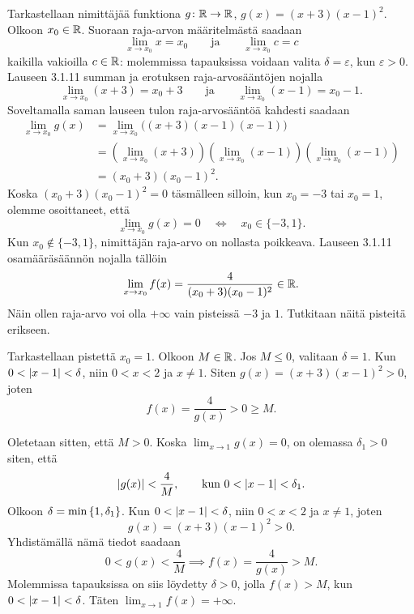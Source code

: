 \documentclass[11pt,a4paper]{amsart}
\begin{document}
\begin{solution}
  Tarkastellaan nimittäjää funktiona \(g\colon \mathbb{R} \to \mathbb{R}\),
  \(g(x) = (x + 3)(x - 1)^2\). Olkoon \(x_0 \in \mathbb{R}\).
  Suoraan raja-arvon määritelmästä saadaan
  \[
    \lim_{x \to x_0} x = x_0
    \qquad\text{ja}\qquad
    \lim_{x \to x_0} c = c
  \]
  kaikilla vakioilla \(c \in \mathbb{R}\): molemmissa tapauksissa voidaan
  valita \(\delta = \varepsilon\), kun \(\varepsilon > 0\).
  Lauseen 3.1.11 summan ja erotuksen raja-arvosääntöjen nojalla
  \[
    \lim_{x \to x_0} (x + 3) = x_0 + 3
    \qquad\text{ja}\qquad
    \lim_{x \to x_0} (x - 1) = x_0 - 1.
  \]
  Soveltamalla saman lauseen tulon raja-arvosääntöä kahdesti saadaan
  \[
    \begin{aligned}
      \lim_{x \to x_0} g(x)
      &= \lim_{x \to x_0} \bigl((x + 3)(x - 1)(x - 1)\bigr) \\
      &= \left(\lim_{x \to x_0} (x + 3)\right)
      \left(\lim_{x \to x_0} (x - 1)\right)
      \left(\lim_{x \to x_0} (x - 1)\right) \\
      &= (x_0 + 3)(x_0 - 1)^2.
    \end{aligned}
  \]
  Koska \((x_0 + 3)(x_0 - 1)^2 = 0\) täsmälleen silloin, kun
  \(x_0 = -3\) tai \(x_0 = 1\), olemme osoittaneet, että
  \[
    \lim_{x \to x_0} g(x) = 0
    \quad\Longleftrightarrow\quad
    x_0 \in \{-3,1\}.
  \]
  Kun \(x_0 \notin \{-3,1\}\), nimittäjän raja-arvo on nollasta poikkeava.
  Lauseen 3.1.11 osamääräsäännön nojalla tällöin
  \[
    \lim_{x \to x_0} f(x)
    = \frac{4}{(x_0 + 3)(x_0 - 1)^2} \in \mathbb{R}.
  \]
  Näin ollen raja-arvo voi olla \(+\infty\) vain pisteissä \(-3\) ja \(1\).
  Tutkitaan näitä pisteitä erikseen.

  Tarkastellaan pistettä \(x_0 = 1\). Olkoon \(M \in \mathbb{R}\).
  Jos \(M \leq 0\), valitaan \(\delta = 1\). Kun
  \(0 < \lvert x - 1\rvert < \delta\), niin \(0 < x < 2\) ja \(x \neq 1\).
  Siten \(g(x) = (x + 3)(x - 1)^2 > 0\), joten
  \[
    f(x) = \frac{4}{g(x)} > 0 \geq M.
  \]

  Oletetaan sitten, että \(M > 0\). Koska \(\lim_{x \to 1} g(x) = 0\),
  on olemassa \(\delta_1 > 0\) siten, että
  \[
    \lvert g(x)\rvert < \frac{4}{M},
    \qquad\text{kun } 0 < \lvert x - 1\rvert < \delta_1.
  \]
  Olkoon \(\delta = \min\left\lbrace1, \delta_1\right\rbrace\). Kun \(0 < \lvert x - 1\rvert < \delta\),
  niin \(0 < x < 2\) ja \(x \neq 1\), joten
  \[
    g(x) = (x + 3)(x - 1)^2 > 0.
  \]
  Yhdistämällä nämä tiedot saadaan
  \[
    0 < g(x) < \frac{4}{M} \implies f(x) = \frac{4}{g(x)} > M.
  \]
  Molemmissa tapauksissa on siis löydetty \(\delta > 0\), jolla
  \(f(x) > M\), kun \(0 < \lvert x - 1\rvert < \delta\).
  Täten \(\lim_{x \to 1} f(x) = +\infty\).


\end{solution}
\end{document}
